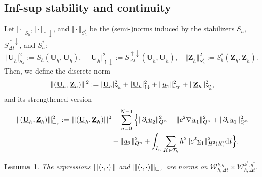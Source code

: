 \documentclass[sn-mathphys-num]{sn-jnl}
\newtheorem{lem}[thm]{Lemma}
\numberwithin{equation}{section}
\newcommand{\wop}{\square_c}
\newcommand{\tnorm}[1]{\vert\hspace{-0.3mm}\Vert#1\Vert\hspace{-0.3mm}\vert}
\newcommand{\dT}{\mathrm{d}t}
\newcommand{\ProdFullyDiscrSpace}[2]{ \mathcal{W}^{ {#1},{#2}}_{h, \Delta t  } }
\newcommand{\Uh}{\underline{\mathbf{U}}_h}
\newcommand{\Zh}{\underline{\mathbf{Z}}_h}
\newcommand{\ul}{\underline{u}}
\newcommand{\Sud}{S^{\uparrow \downarrow}_{\Delta t}}
\newcommand{\dt}{\partial_t}
\begin{document}
\subsection{Inf-sup stability and continuity}\label{sec:analysis:infsup}
Let $\vert \cdot \vert_{S_h}, \vert \cdot \vert_{\uparrow \downarrow}$, and $\Vert \cdot \Vert_{S_h^{\ast}}$ be the (semi-)norms induced by the stabilizers $S_h$, $\Sud$, and $S_h^{\ast}$:
\begin{equation}
    \vert \Uh \vert^2_{S_h} := S_h(\Uh,\Uh), \quad \vert \Uh \vert^2_{\uparrow \downarrow} := \Sud(\Uh,\Uh), \quad \Vert \Zh \Vert^2_{S_h^{\ast}} := S_h^{\ast}(\Zh,\Zh).
\end{equation}
Then, we define the discrete norm 
\begin{equation}
    \tnorm{ (\Uh,\Zh) }^2 :=  \vert \Uh \vert^2_{S_h} + \vert \Uh \vert^2_{\uparrow \downarrow} + \Vert \ul_1 \Vert^2_{\omega_T} + \Vert \Zh \Vert^2_{S_h^\ast},
\end{equation}
and its strengthened version
\begin{equation}\label{eq:tnormwop}
    \begin{aligned}
        \tnorm{(\Uh, \Zh)}^2_{\wop} := \tnorm{(\Uh, \Zh)}^2 &+ \sum_{n = 0}^{N -1} \Big\{ \Vert \dt \ul_2 \Vert^2_{Q^n} + \Vert c^2 \nabla \ul_1 \Vert^2_{Q^n} + \Vert \dt \ul_1 \Vert^2_{Q^n} \\
        &+ \Vert \ul_2 \Vert^2_{Q^n} + \int_{I_n} \sum_{K \in \mathcal{T}_h} h^2 \Vert c^2 \ul_1 \Vert^2_{H^2(K)} \dT \Big\}. 
    \end{aligned}
\end{equation}

\begin{lem}
    The expressions $\tnorm{(\cdot,\cdot)}$ and $\tnorm{(\cdot,\cdot)}_{\wop}$ are norms on $\ProdFullyDiscrSpace{k}{q} \times \ProdFullyDiscrSpace{k^\ast}{q^\ast}$.  
\end{lem}
\end{document}
